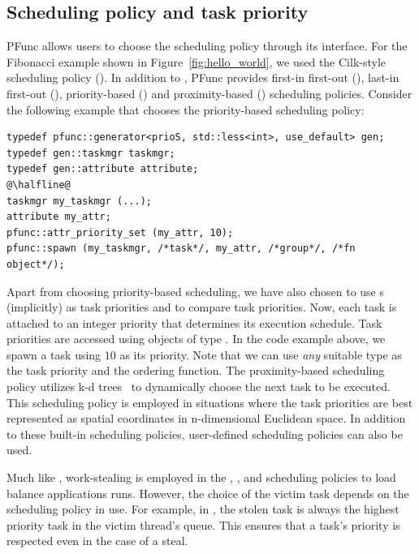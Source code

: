 \documentclass{sig-alternate}
\begin{document}
\subsection{Scheduling policy and task priority}
\label{sec:scheduling}
PFunc allows users to choose the scheduling policy through its 
interface. For the Fibonacci example shown in Figure~\ref{fig:hello_world}, we
used the Cilk-style scheduling policy (). In addition to
, PFunc provides first-in first-out (), last-in
first-out (), priority-based () and proximity-based
() scheduling policies.  Consider the following example that
chooses the priority-based scheduling policy:

\begin{lstlisting}
typedef pfunc::generator<prioS, std::less<int>, use_default> gen; 
typedef gen::taskmgr taskmgr;
typedef gen::attribute attribute;
@\halfline@
taskmgr my_taskmgr (...);
attribute my_attr;
pfunc::attr_priority_set (my_attr, 10);
pfunc::spawn (my_taskmgr, /*task*/, my_attr, /*group*/, /*fn object*/);
\end{lstlisting}

Apart from choosing priority-based scheduling, we have also chosen to use
s (implicitly) as task priorities and  to
compare task priorities. Now, each task is attached to an integer priority
that determines its execution schedule. Task priorities are accessed  using
objects of type . In the code example above, we spawn a task
using $10$ as its priority. Note that we can use \textit{any} suitable type as
the task priority and the ordering function. The proximity-based scheduling
policy utilizes k-d trees~\cite{bentley:1975} to dynamically choose the next
task to be executed.  This scheduling policy is employed in situations where
the task priorities are best represented as spatial coordinates in
n-dimensional Euclidean space. In addition to these built-in scheduling
policies, user-defined scheduling policies can also be used. 

Much like , work-stealing is employed in the ,
,  and  scheduling policies to load balance
applications runs. However, the choice of the victim task  depends  on the
scheduling policy in use. For example, in , the stolen task is
always the highest priority task in the victim thread's queue. This ensures
that a task's priority is respected even in the case of a steal.
\end{document}
